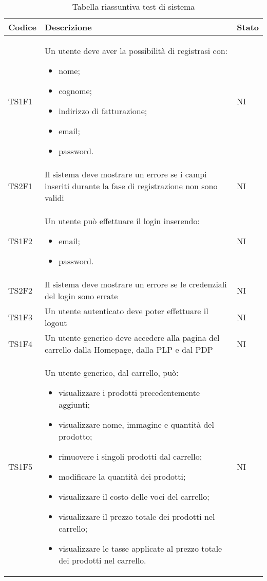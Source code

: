 {

\centering
\renewcommand{\arraystretch}{2}
\begin{longtable}{C{3cm} C{10.2cm} C{1.5cm}}
\caption{Tabella riassuntiva test di sistema}\\
\textbf{Codice} &
\textbf{Descrizione}&
\textbf{Stato}\\
\endhead


TS1F1 & Un utente deve aver la possibilità di registrasi con:
\begin{itemize}
	\item nome;
	\item cognome;
	\item indirizzo di fatturazione;
	\item email;
	\item password.
\end{itemize} & NI\\
TS2F1 & Il sistema deve mostrare un errore se
i campi inseriti durante la fase di registrazione non sono validi & NI\\
TS1F2 & Un utente può effettuare il login inserendo:
\begin{itemize}
	\item email;
	\item password.
\end{itemize} &  NI\\
TS2F2 & Il sistema deve mostrare un errore se le credenziali del login sono errate & NI\\
TS1F3 & Un utente autenticato deve poter effettuare il
logout & NI\\
TS1F4 & Un utente generico deve accedere alla pagina del carrello dalla Homepage, dalla PLP e dal PDP & NI\\
TS1F5 & Un utente generico, dal carrello, può:
\begin{itemize}
	\item visualizzare i prodotti precedentemente aggiunti;
	\item visualizzare nome, immagine e quantità del prodotto;
	\item rimuovere i singoli prodotti dal carrello;
	\item modificare la quantità dei prodotti;
	\item visualizzare il costo delle voci del carrello;
	\item visualizzare il prezzo totale dei prodotti nel carrello;
	\item visualizzare le tasse applicate al prezzo totale dei prodotti nel carrello.
\end{itemize}
& NI\\


\end{longtable}}
